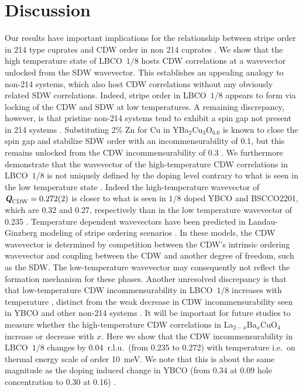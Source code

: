 \documentclass[9pt,twocolumn,twoside]{pnas-new}
\def\LBCO{LBCO~$1/8$}
\def\mathbi#1{\ensuremath{\textbf{\em #1}}}
\begin{document}
\section*{Discussion}
Our results have important implications for the relationship between stripe order in 214 type cuprates and CDW order in non 214 cuprates \cite{Keimer2015}. We show that the high temperature state of \LBCO{} hosts CDW correlations at a wavevector unlocked from the SDW wavevector. This establishes an appealing analogy to non-214 systems, which also host CDW correlations without any obviously related SDW correlations. Indeed, stripe order in \LBCO{} appears to form via locking of the CDW and SDW at low temperatures. A remaining discrepancy, however, is that pristine non-214 systems tend to exhibit a spin gap not present in 214 systems \cite{Hinkov2007, Stock2005, Stock2010, Xu2009}. Substituting 2\% Zn for Cu in YBa$_2$Cu$_3$O$_{6.6}$ is known to close the spin gap and stabilize SDW order with an incommensurability of 0.1, but this remains unlocked from the CDW incommensurability of 0.3 \cite{Suchaneck2010}.  We furthermore demonstrate that the wavevector of the high-temperature CDW correlations in \LBCO{} is not uniquely defined by the doping level contrary to what is seen in the low temperature state \cite{Cheong1991, Thurston1992, Tranquada1995, Hucker2011, Fujita2004}. Indeed the high-temperature wavevector of $\mathbi{Q}_\text{CDW}= 0.272(2)$ is closer to what is seen in $1/8$ doped YBCO and BSCCO2201, which are 0.32 and 0.27, respectively than in the low temperature wavevector of 0.235 \cite{Comin2014, Ghiringhelli2012}. Temperature dependent wavevectors have been predicted in Landau-Ginzberg modeling of stripe ordering scenarios \cite{Zachar2000, Nie2017}. In these models, the CDW wavevector is determined by competition between the CDW's intrinsic ordering wavevector and coupling between the CDW and another degree of freedom, such as the SDW. The low-temperature wavevector may consequently not reflect the formation mechanism for these phases. Another unresolved discrepancy is that that low-temperature CDW incommensurability in \LBCO{} increases with temperature \cite{Fujita2004, Hucker2011}, distinct from the weak decrease in CDW incommensurability seen in YBCO and other non-214 systems \cite{Blanco-Canosa2013, Blanco-Canosa2014, Hucker2014}. It will be important for future studies to measure whether the high-temperature CDW correlations in La$_{2-x}$Ba$_{x}$CuO$_{4}$ increase or decrease with $x$. Here we show that the CDW incommensurability in \LBCO{} changes by 0.04~r.l.u.\ (from 0.235 to 0.272) with temperature i.e.\ on thermal energy scale of order 10~meV. We note that this is about the same magnitude as the doping induced change in YBCO (from 0.34 at 0.09 hole concentration to 0.30 at 0.16) \cite{Blanco-Canosa2014, Hucker2014}.
\end{document}
